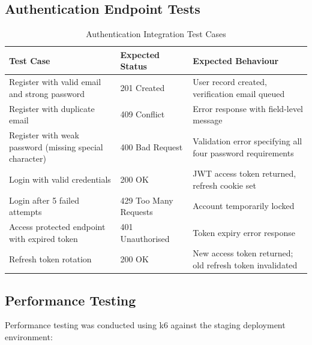 \documentclass[12pt, a4paper, oneside]{report}
\begin{document}
\subsection{Authentication Endpoint Tests}

\begin{table}[H]
\centering
\caption{Authentication Integration Test Cases}
\label{tab:auth_tests}
\renewcommand{\arraystretch}{1.4}
\begin{tabularx}{\textwidth}{|X|p{3cm}|p{3cm}|}
\hline
\textbf{Test Case} & \textbf{Expected Status} & \textbf{Expected Behaviour} \\
\hline
Register with valid email and strong password & 201 Created & User record created, verification email queued \\
\hline
Register with duplicate email & 409 Conflict & Error response with field-level message \\
\hline
Register with weak password (missing special character) & 400 Bad Request & Validation error specifying all four password requirements \\
\hline
Login with valid credentials & 200 OK & JWT access token returned, refresh cookie set \\
\hline
Login after 5 failed attempts & 429 Too Many Requests & Account temporarily locked \cite{owasp2021} \\
\hline
Access protected endpoint with expired token & 401 Unauthorised & Token expiry error response \\
\hline
Refresh token rotation & 200 OK & New access token returned; old refresh token invalidated \\
\hline
\end{tabularx}
\end{table}

\subsection{Performance Testing}

Performance testing was conducted using k6 \cite{k62024} against the staging deployment environment:
\end{document}
